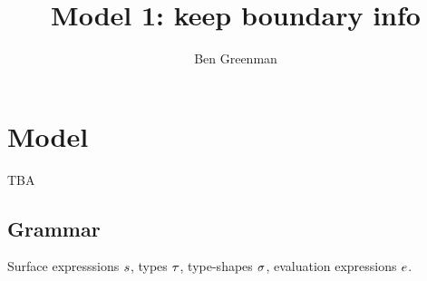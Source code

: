 \documentclass[nonacm,10pt]{acmart}
\title{Model 1: keep boundary info}
\author{Ben Greenman}
\begin{document}
\maketitle


\section{Model}

TBA

%


\subsection{Grammar}

Surface expresssions $s$,
 types $\tau$,
 type-shapes $\sigma$,
 evaluation expressions $e$.
\end{document}
